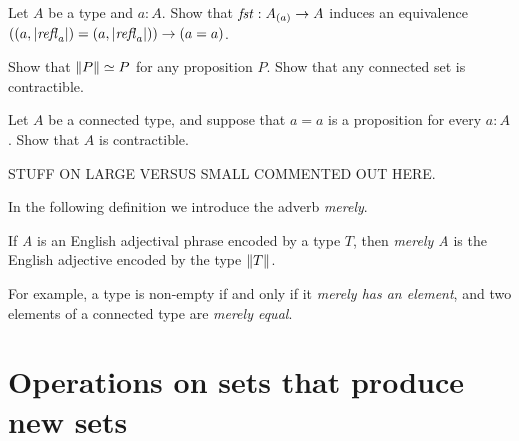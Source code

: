 \begin{xca}\label{xca:component-same-loops}
Let $A$ be a type and $a:A$. Show that $\mathop{\mathit{fst}}: A_{(a)} \to A$
induces an equivalence $((a,\lvert\mathop{{\it refl}_{a}}\rvert)=(a,\lvert\mathop{{\it refl}_{a}}\rvert)) \to (a=a)$.
\end{xca}

\begin{xca}\label{xca:prop-set-trivia}
Show that $\lVert P\rVert \simeq P$ for any proposition $P$.
Show that any connected set is contractible.
\end{xca}

\begin{xca}\label{xca:connected-trivia}
Let $A$ be a connected type, and suppose that $a=a$ is a proposition for every $a:A$. 
Show that $A$ is contractible.
\end{xca}

STUFF ON LARGE VERSUS SMALL COMMENTED OUT HERE.

In the following definition we introduce the adverb {\em merely}.

\begin{definition}\label{def:merely}
  If {\em A} is an English adjectival phrase encoded by a type $T$, 
then {\em merely A} is the English adjective encoded by the type $\lVert T\rVert$.
\end{definition}

For example, a type is non-empty if and only if it {\em merely has an element}, and two elements of a connected type are {\em merely equal}.

\section{Operations on sets that produce new sets}
\label{sec:operations-on-sets}

